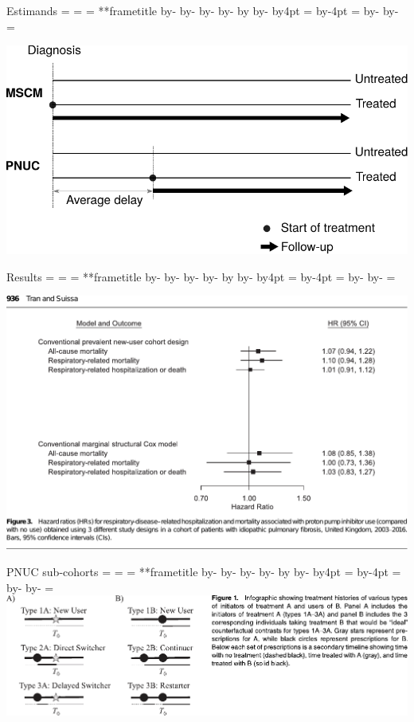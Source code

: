 \documentclass[aspectratio=169,12pt]{beamer} %
\makeatletter
\newif\ifsidebartheme
\newcommand*{\calculatespace}{%
    \contentheight=\paperheight%
    \ifx\beamer@frametitle\@empty%
        \setbox\@tempboxa=\box\voidb@x%
      \else%
        \setbox\@tempboxa=\vbox{%
          \vbox{}%
          {\parskip0pt\usebeamertemplate***{frametitle}}%
        }%
        \ifsidebartheme%
          \advance\contentheight by-1em%
        \fi%
      \fi%
    \advance\contentheight by-\ht\@tempboxa%
    \advance\contentheight by-\dp\@tempboxa%
    \advance\contentheight by-\beamer@frametopskip%
    \ifbeamer@plainframe%
    \contentbottom=0pt%
    \else%
    \advance\contentheight by-\headheight%
    \advance\contentheight by\headdp%
    \advance\contentheight by-\footheight%
    \advance\contentheight by4pt%
    \contentbottom=\footheight%
    \advance\contentbottom by-4pt%
    \fi%
    \contentwidth=\paperwidth%
    \ifbeamer@plainframe%
    \contentleft=0pt%
    \else%
    \advance\contentwidth by-\beamer@rightsidebar%
    \advance\contentwidth by-\beamer@leftsidebar\relax%
    \contentleft=\beamer@leftsidebar%
    \fi%
}
\makeatother
\begin{document}
\begin{frame}{Estimands}
    \calculatespace%
    \begin{center}
	\includegraphics[height=0.95\contentheight]{ref/estimands.pdf}
    \end{center}
\end{frame}

\begin{frame}{Results}
    \calculatespace%
    \begin{center}
	\includegraphics[height=0.90\contentheight]{ref/suissa-fig3-mscm.pdf}
    \end{center}
\end{frame}

\begin{frame}{PNUC sub-cohorts}
    \calculatespace%
	\includegraphics[width=0.85\contentwidth]{ref/webster-fig1.pdf}
\end{frame}
\end{document}
